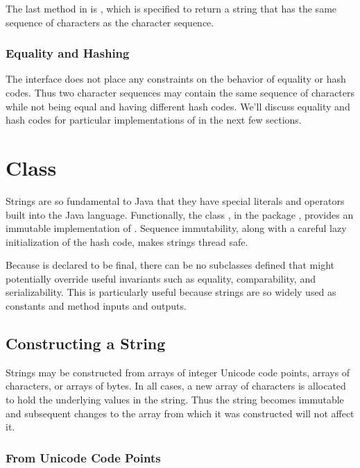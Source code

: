 The last method in  is , which is
specified to return a string that has the same sequence of characters
as the character sequence.  

\subsubsection{Equality and Hashing}

The  interface does not place any constraints on
the behavior of equality or hash codes.  Thus two character sequences
may contain the same sequence of characters while not being equal
and having different hash codes.  We'll discuss equality and hash
codes for particular implementations of  in the
next few sections.


\section{ Class}

Strings are so fundamental to Java that they have special literals and
operators built into the Java language.  Functionally, the class
, in the package , provides an immutable
implementation of .  Sequence immutability, along
with a careful lazy initialization of the hash code, makes strings
thread safe.

Because  is declared to be final, there can be no
subclasses defined that might potentially override useful invariants
such as equality, comparability, and serializability.  This is
particularly useful because strings are so widely used as constants
and method inputs and outputs.

\subsection{Constructing a String}

Strings may be constructed from arrays of integer Unicode code points,
arrays of characters, or arrays of bytes.  In all cases, a new array
of characters is allocated to hold the underlying  values
in the string.  Thus the string becomes immutable and subsequent
changes to the array from which it was constructed will not affect it.

\subsubsection{From Unicode Code Points}

